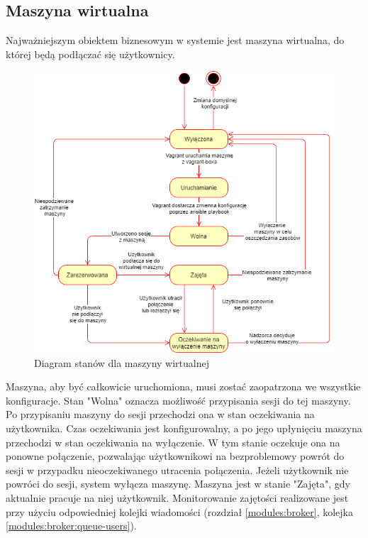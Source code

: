 \documentclass[../opis-rozwiazania.tex]{subfiles}
\begin{document}
\label{state_diagrams}

\subsection{Maszyna wirtualna}
Najważniejszym obiektem biznesowym w systemie jest maszyna wirtualna, do której będą podłączać się użytkownicy.

\begin{figure}[H]
    \centering
    \includegraphics[width=\textwidth]{../diagrams/state_diagrams/virtual_machine.png}
    \caption{Diagram stanów dla maszyny wirtualnej}
    \label{state_vm}
\end{figure}

Maszyna, aby być całkowicie uruchomiona, musi zostać zaopatrzona we wszystkie konfiguracje.
Stan "Wolna" oznacza możliwość przypisania sesji do tej maszyny.
Po przypisaniu maszyny do sesji przechodzi ona w stan oczekiwania na użytkownika. Czas oczekiwania jest konfigurowalny, a po jego upłynięciu maszyna przechodzi w stan oczekiwania na wyłączenie.
W tym stanie oczekuje ona na ponowne połączenie, pozwalając użytkownikowi na bezproblemowy powrót do sesji w przypadku nieoczekiwanego utracenia połączenia. Jeżeli użytkownik nie powróci do sesji, system wyłącza maszynę.
Maszyna jest w stanie "Zajęta", gdy aktualnie pracuje na niej użytkownik. Monitorowanie zajętości realizowane jest przy użyciu odpowiedniej kolejki wiadomości (rozdział \ref{modules:broker}, kolejka \ref{modules:broker:queue-users}).
\end{document}
